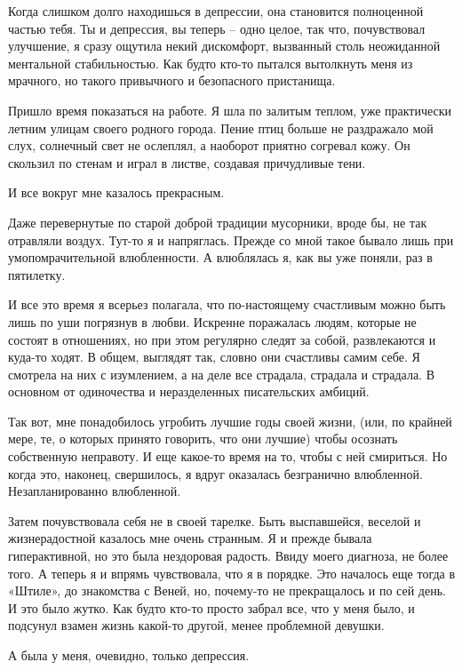 \documentclass[
]{book}
\begin{document}
Когда слишком долго находишься в депрессии, она становится полноценной частью тебя. Ты и депрессия, вы теперь -- одно целое, так что, почувствовал улучшение, я сразу ощутила некий дискомфорт, вызванный столь неожиданной ментальной стабильностью. Как будто кто-то пытался вытолкнуть меня из мрачного, но такого привычного и безопасного пристанища.

Пришло время показаться на работе. Я шла по залитым теплом, уже практически летним улицам своего родного города. Пение птиц больше не раздражало мой слух, солнечный свет не ослеплял, а наоборот приятно согревал кожу. Он скользил по стенам и играл в листве, создавая причудливые тени.

И все вокруг мне казалось прекрасным.

Даже перевернутые по старой доброй традиции мусорники, вроде бы, не так отравляли воздух. Тут-то я и напряглась. Прежде со мной такое бывало лишь при умопомрачительной влюбленности. А влюблялась я, как вы уже поняли, раз в пятилетку.

И все это время я всерьез полагала, что по-настоящему счастливым можно быть лишь по уши погрязнув в любви. Искренне поражалась людям, которые не состоят в отношениях, но при этом регулярно следят за собой, развлекаются и куда-то ходят. В общем, выглядят так, словно они счастливы самим себе. Я смотрела на них с изумлением, а на деле все страдала, страдала и страдала. В основном от одиночества и неразделенных писательских амбиций.

Так вот, мне понадобилось угробить лучшие годы своей жизни, (или, по крайней мере, те, о которых принято говорить, что они лучшие) чтобы осознать собственную неправоту. И еще какое-то время на то, чтобы с ней смириться. Но когда это, наконец, свершилось, я вдруг оказалась безгранично влюбленной. Незапланированно влюбленной.

Затем почувствовала себя не в своей тарелке. Быть выспавшейся, веселой и жизнерадостной казалось мне очень странным. Я и прежде бывала гиперактивной, но это была нездоровая радость. Ввиду моего диагноза, не более того. А теперь я и впрямь чувствовала, что я в порядке. Это началось еще тогда в «Штиле», до знакомства с Веней, но, почему-то не прекращалось и по сей день. И это было жутко. Как будто кто-то просто забрал все, что у меня было, и подсунул взамен жизнь какой-то другой, менее проблемной девушки.

А была у меня, очевидно, только депрессия.

\hypertarget{chapter-42}{%
\chapter{~}\label{chapter-42}}
\end{document}
